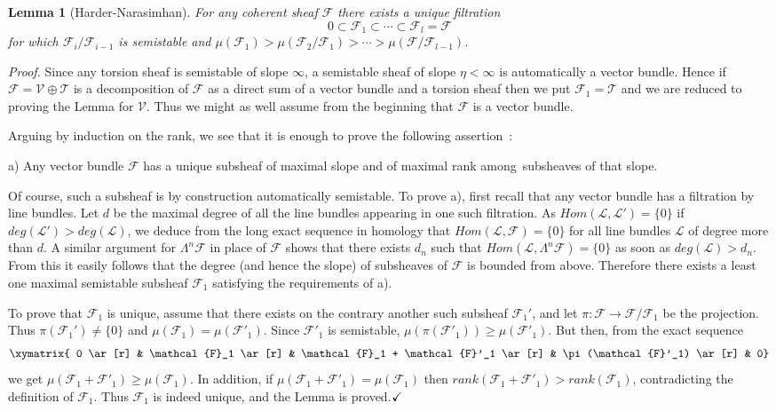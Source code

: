 \documentclass[a4paper,10pt]{amsart}
\def\qed{$\hfill \checkmark$}
\newtheorem{lem}[theo]{Lemma}
\numberwithin{equation}{section}
\begin{document}
{\begin{lem}[Harder-Narasimhan] For any coherent sheaf $\mathcal{F}$ there exists a unique filtration
$$0 \subset \mathcal{F}_1 \subset \cdots \subset \mathcal{F}_l=\mathcal{F}$$
for which $\mathcal{F}_i/\mathcal{F}_{i-1}$ is semistable and $\mu(\mathcal{F}_1) > \mu(\mathcal{F}_2/\mathcal{F}_1) > \cdots > \mu(\mathcal{F}/\mathcal{F}_{l-1})$.
\end{lem}
\noindent
\textit{Proof.} Since any torsion sheaf is semistable of slope $\infty$, a semistable sheaf of slope $\eta <\infty$ is automatically a vector bundle. Hence if $\mathcal{F}=\mathcal{V} \oplus \mathcal{T}$ is a decomposition of $\mathcal{F}$ as a direct sum of a vector bundle and a torsion sheaf then we put $\mathcal{F}_1=\mathcal{T}$ and we are reduced to proving the Lemma for $\mathcal{V}$. Thus we might as well assume from the beginning that $\mathcal{F}$ is a vector bundle.

Arguing by induction on the rank, we see that it is enough to prove the following assertion~:

\vspace{.05in}

a) Any vector bundle $\mathcal{F}$ has a unique subsheaf of maximal slope and of maximal rank among\ subsheaves of that slope.

\vspace{.05in}

Of course, such a subsheaf is by construction automatically semistable. To prove a), first recall that any vector bundle has a filtration by line bundles. Let $d$ be the maximal degree of all the line bundles appearing in one such filtration. As $Hom(\mathcal{L},\mathcal{L}')=\{0\}$ if $deg(\mathcal{L}')>deg(\mathcal{L})$, we deduce from the long exact sequence in homology that $Hom(\mathcal{L},\mathcal{F}) =\{0\}$ for all line bundles $\mathcal{L}$ of degree more than $d$. A similar argument for $\Lambda^n\mathcal{F}$ in place of $\mathcal{F}$ shows that there exists $d_n$ such that $Hom(\mathcal{L},\Lambda^n\mathcal{F})=\{0\}$ as soon as $deg(\mathcal{L}) >d_n$. From this it easily follows that the degree (and hence the slope) of subsheaves of $\mathcal{F}$ is bounded from above. Therefore there exists a least one maximal semistable subsheaf $\mathcal{F}_1$ satisfying the requirements of a).

To prove that $\mathcal{F}_1$ is unique, assume that there exists on the contrary another such subsheaf $\mathcal{F}_1'$, and let $\pi: \mathcal{F} \to \mathcal{F}/\mathcal{F}_1$ be the projection. Thus $\pi(\mathcal{F}_1') \neq \{0\}$ and $\mu(\mathcal{F}_1)=\mu(\mathcal{F}'_1)$. Since $\mathcal{F}'_1$ is semistable, $\mu(\pi(\mathcal{F}'_1)) \geq \mu(\mathcal{F}'_1)$. But then, from the exact sequence
$$\xymatrix{ 0 \ar[r] & \mathcal{F}_1 \ar[r] & \mathcal{F}_1 + \mathcal{F}'_1 \ar[r] & \pi(\mathcal{F}'_1) \ar[r] & 0}$$
we get $\mu(\mathcal{F}_1+\mathcal{F}'_1)\geq \mu(\mathcal{F}_1)$. In addition, if $\mu(\mathcal{F}_1+\mathcal{F}'_1)=\mu(\mathcal{F}_1)$ then $rank(\mathcal{F}_1+\mathcal{F}'_1)>rank(\mathcal{F}_1)$, contradicting the definition of $\mathcal{F}_1$. Thus $\mathcal{F}_1$ is indeed unique, and the Lemma is proved.\qed

}
\end{document}
